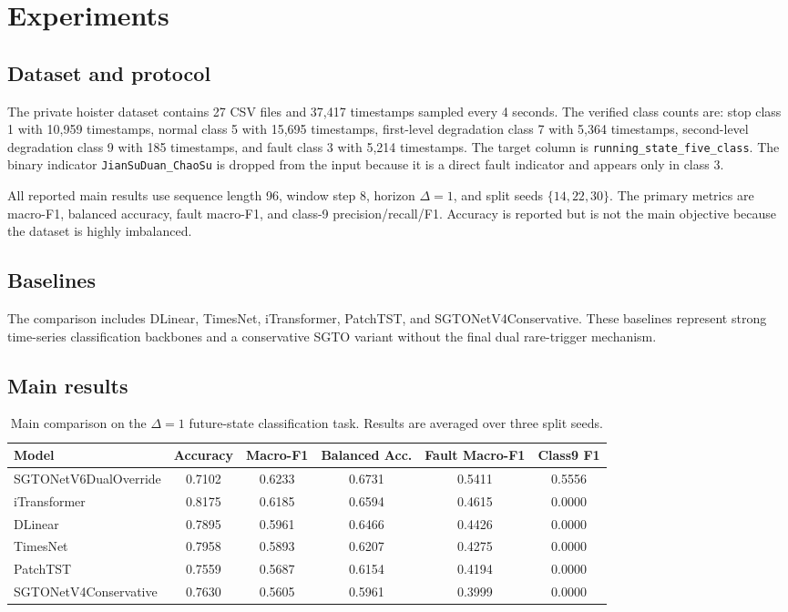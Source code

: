 \section{Experiments}
\label{sec:experiments}

\subsection{Dataset and protocol}

The private hoister dataset contains 27 CSV files and 37,417 timestamps sampled every 4 seconds. The verified class counts are: stop class 1 with 10,959 timestamps, normal class 5 with 15,695 timestamps, first-level degradation class 7 with 5,364 timestamps, second-level degradation class 9 with 185 timestamps, and fault class 3 with 5,214 timestamps. The target column is \texttt{running\_state\_five\_class}. The binary indicator \texttt{JianSuDuan\_ChaoSu} is dropped from the input because it is a direct fault indicator and appears only in class 3.

All reported main results use sequence length 96, window step 8, horizon $\Delta=1$, and split seeds $\{14,22,30\}$. The primary metrics are macro-F1, balanced accuracy, fault macro-F1, and class-9 precision/recall/F1. Accuracy is reported but is not the main objective because the dataset is highly imbalanced.

\subsection{Baselines}

The comparison includes DLinear, TimesNet, iTransformer, PatchTST, and SGTONetV4Conservative. These baselines represent strong time-series classification backbones and a conservative SGTO variant without the final dual rare-trigger mechanism.

\subsection{Main results}

\begin{table}[t]
\centering
\caption{Main comparison on the $\Delta=1$ future-state classification task. Results are averaged over three split seeds.}
\label{tab:main_results_sgto}
\begin{tabular}{lccccc}
\toprule
Model & Accuracy & Macro-F1 & Balanced Acc. & Fault Macro-F1 & Class9 F1 \\
\midrule
SGTONetV6DualOverride & 0.7102 & 0.6233 & 0.6731 & 0.5411 & 0.5556 \\
iTransformer & 0.8175 & 0.6185 & 0.6594 & 0.4615 & 0.0000 \\
DLinear & 0.7895 & 0.5961 & 0.6466 & 0.4426 & 0.0000 \\
TimesNet & 0.7958 & 0.5893 & 0.6207 & 0.4275 & 0.0000 \\
PatchTST & 0.7559 & 0.5687 & 0.6154 & 0.4194 & 0.0000 \\
SGTONetV4Conservative & 0.7630 & 0.5605 & 0.5961 & 0.3999 & 0.0000 \\
\bottomrule
\end{tabular}
\end{table}

